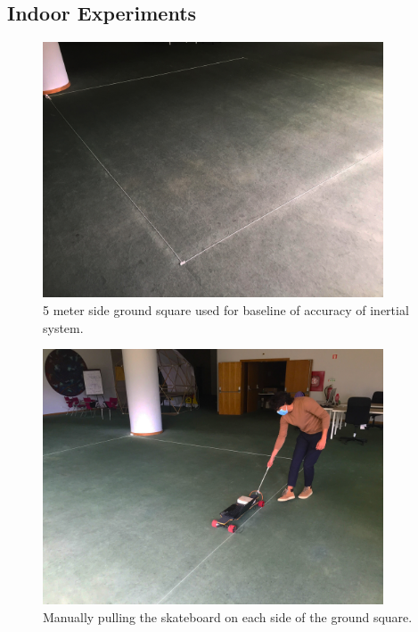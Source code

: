 \subsection{Indoor Experiments}
\begin{figure}[!h]
    \centering
    \includegraphics[width=0.9\textwidth]{figures/indoor.jpg}
    \caption{ 5 meter side ground square used for baseline of accuracy of inertial system. }
    \label{fig:indoor}
\end{figure}

\begin{figure}[!h]
    \centering
    \includegraphics[width=0.9\textwidth]{figures/indoor_1.jpg}
    \caption{ Manually pulling the skateboard on each side of the ground square. }
    \label{fig:indoor_1}
\end{figure}

